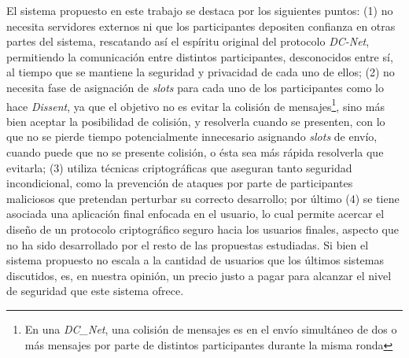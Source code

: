 El sistema propuesto en este trabajo se destaca por los siguientes puntos: (1) 
no necesita servidores externos ni que los participantes depositen confianza 
en otras partes del sistema, rescatando así el espíritu original del protocolo 
\emph{DC-Net}, permitiendo la comunicación entre distintos participantes, 
desconocidos entre sí, al tiempo que se mantiene la seguridad y privacidad 
de cada uno de ellos; (2) no necesita fase de asignación de \emph{slots} para 
cada uno de los participantes como lo hace \emph{Dissent}, ya que el objetivo 
no es evitar la colisión de mensajes\footnote{En una \emph{DC_Net}, una 
colisión de mensajes es en el envío simultáneo de dos o más mensajes por parte 
de distintos participantes durante la misma ronda}, sino más bien aceptar la 
posibilidad de colisión, y resolverla cuando se presenten, con lo que no se 
pierde tiempo potencialmente innecesario asignando \emph{slots} de envío, 
cuando puede que no se presente colisión, o ésta sea más rápida resolverla que 
evitarla; (3) utiliza técnicas criptográficas que aseguran tanto seguridad 
incondicional, como la prevención de ataques por parte de participantes 
maliciosos que pretendan perturbar su correcto desarrollo; por último (4) se 
tiene asociada una aplicación final enfocada en el usuario, lo cual permite 
acercar el diseño de un protocolo criptográfico seguro hacia los usuarios 
finales, aspecto que no ha sido desarrollado por el resto de las propuestas 
estudiadas. Si bien el sistema propuesto no escala a la cantidad de usuarios 
que los últimos sistemas discutidos, es, en nuestra opinión, un precio justo a 
pagar para alcanzar el nivel de seguridad que este sistema ofrece.
